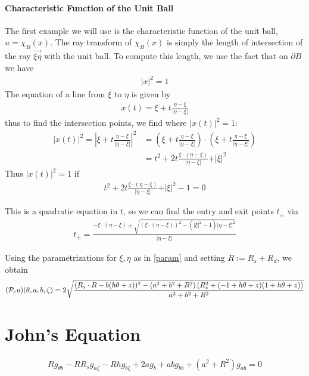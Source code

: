 \documentclass[12pt]{article}
\begin{document}
\paragraph{Characteristic Function of the Unit Ball}
The first example we will use is the characteristic function of the unit ball, $u = \chi_{B}(x)$.  The ray transform of $\chi_B(x)$ is simply the length of intersection of the ray $\overrightarrow{\xi\eta}$ with the unit ball.  To compute this length, we use the fact that on $\partial B$ we have
\begin{align*}
\vert x\vert ^2 = 1
\end{align*}  The equation of a line from $\xi$ to $\eta$ is given by 
\begin{align*}
x(t) = \xi+t\frac{\eta-\xi}{\vert \eta-\xi\vert}
\end{align*}thus to find the intersection points, we find where $\vert x(t)\vert^2 = 1$: 
\begin{align*}
\vert x(t)\vert ^2 = \left\vert \xi+t\frac{\eta-\xi}{\vert \eta-\xi\vert}\right\vert ^2  &= \left(\xi+t\frac{\eta-\xi}{\vert \eta-\xi\vert}\right)\cdot \left(\xi+t\frac{\eta-\xi}{\vert \eta-\xi\vert}\right)\\
& = t^2 + 2t\frac{\xi\cdot(\eta-\xi)}{\vert \eta -\xi\vert} + \vert \xi\vert^2
\end{align*}Thus $\vert x(t)\vert^2 = 1$ if 
\begin{align*}
t^2 + 2t\frac{\xi\cdot(\eta-\xi)}{\vert \eta -\xi\vert} + \vert \xi\vert^2-1=0
\end{align*}

This is a quadratic equation in $t$, so we can find the entry and exit points $t_{\pm}$ via 
\begin{align*}
t_{\pm} = \frac{-\xi\cdot(\eta-\xi)\pm\sqrt{(\xi\cdot (\eta-\xi))^2-(\vert\xi\vert^2-1)\vert\eta-\xi\vert^2}}{\vert\eta-\xi\vert}
\end{align*}

Using the parametrizations for $\xi,\eta$ as in \eqref{param} and setting $R:=R_s+R_d$, we obtain 
\begin{align*}
(\P_cu)(\theta,a,b,\zeta) = 2\sqrt{\frac{(R_s \cdot R-b (h \theta+z))^2-\left(a^2+b^2+R^2\right) \left(R_s^2+(-1+h \theta+z) (1+h \theta+z)\right)}{a^2+b^2+R^2}}
\end{align*}


\section{John's Equation}

\begin{align*}
Rg_{\theta b} - RR_s g_{a\zeta} - Rhg_{b\zeta} + 2ag_b + abg_{bb} + (a^2+R^2)g_{ab} = 0
\end{align*}
\end{document}
